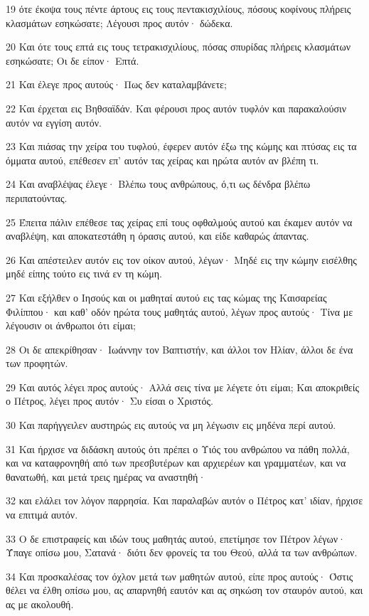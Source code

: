 \par 19 ότε έκοψα τους πέντε άρτους εις τους πεντακισχιλίους, πόσους κοφίνους πλήρεις κλασμάτων εσηκώσατε; Λέγουσι προς αυτόν· δώδεκα.
\par 20 Και ότε τους επτά εις τους τετρακισχιλίους, πόσας σπυρίδας πλήρεις κλασμάτων εσηκώσατε; Οι δε είπον· Επτά.
\par 21 Και έλεγε προς αυτούς· Πως δεν καταλαμβάνετε;
\par 22 Και έρχεται εις Βηθσαϊδάν. Και φέρουσι προς αυτόν τυφλόν και παρακαλούσιν αυτόν να εγγίση αυτόν.
\par 23 Και πιάσας την χείρα του τυφλού, έφερεν αυτόν έξω της κώμης και πτύσας εις τα όμματα αυτού, επέθεσεν επ' αυτόν τας χείρας και ηρώτα αυτόν αν βλέπη τι.
\par 24 Και αναβλέψας έλεγε· Βλέπω τους ανθρώπους, ό,τι ως δένδρα βλέπω περιπατούντας.
\par 25 Έπειτα πάλιν επέθεσε τας χείρας επί τους οφθαλμούς αυτού και έκαμεν αυτόν να αναβλέψη, και αποκατεστάθη η όρασις αυτού, και είδε καθαρώς άπαντας.
\par 26 Και απέστειλεν αυτόν εις τον οίκον αυτού, λέγων· Μηδέ εις την κώμην εισέλθης μηδέ είπης τούτο εις τινά εν τη κώμη.
\par 27 Και εξήλθεν ο Ιησούς και οι μαθηταί αυτού εις τας κώμας της Καισαρείας Φιλίππου· και καθ' οδόν ηρώτα τους μαθητάς αυτού, λέγων προς αυτούς· Τίνα με λέγουσιν οι άνθρωποι ότι είμαι;
\par 28 Οι δε απεκρίθησαν· Ιωάννην τον Βαπτιστήν, και άλλοι τον Ηλίαν, άλλοι δε ένα των προφητών.
\par 29 Και αυτός λέγει προς αυτούς· Αλλά σεις τίνα με λέγετε ότι είμαι; Και αποκριθείς ο Πέτρος, λέγει προς αυτόν· Συ είσαι ο Χριστός.
\par 30 Και παρήγγειλεν αυστηρώς εις αυτούς να μη λέγωσιν εις μηδένα περί αυτού.
\par 31 Και ήρχισε να διδάσκη αυτούς ότι πρέπει ο Υιός του ανθρώπου να πάθη πολλά, και να καταφρονηθή από των πρεσβυτέρων και αρχιερέων και γραμματέων, και να θανατωθή, και μετά τρεις ημέρας να αναστηθή·
\par 32 και ελάλει τον λόγον παρρησία. Και παραλαβών αυτόν ο Πέτρος κατ' ιδίαν, ήρχισε να επιτιμά αυτόν.
\par 33 Ο δε επιστραφείς και ιδών τους μαθητάς αυτού, επετίμησε τον Πέτρον λέγων· Ύπαγε οπίσω μου, Σατανά· διότι δεν φρονείς τα του Θεού, αλλά τα των ανθρώπων.
\par 34 Και προσκαλέσας τον όχλον μετά των μαθητών αυτού, είπε προς αυτούς· Όστις θέλει να έλθη οπίσω μου, ας απαρνηθή εαυτόν και ας σηκώση τον σταυρόν αυτού, και ας με ακολουθή.
